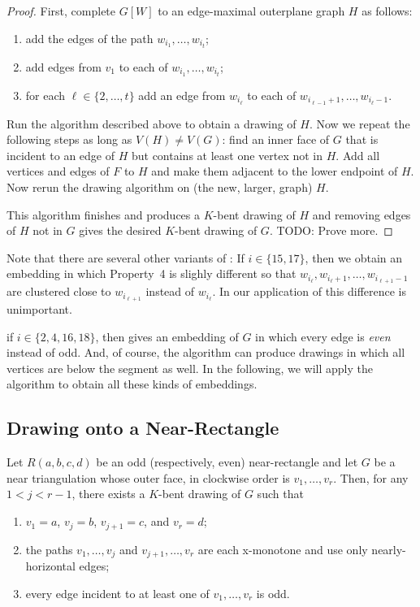 \documentclass{patmorin}
\begin{document}
\begin{proof}
  First, complete $G[W]$ to an edge-maximal outerplane graph $H$ as follows:
\begin{enumerate}
  \item add the edges of the path $w_{i_1},\ldots,w_{i_t}$;
  \item add edges from $v_1$ to each of $w_{i_1},\ldots,w_{i_t}$;
  \item for each $\ell\in\{2,\ldots,t\}$ add an edge from $w_{i_\ell}$ to each of $w_{i_{\ell-1}+1},\ldots,w_{i_\ell-1}$. 
\end{enumerate}
  Run the algorithm described above to obtain a drawing of $H$.  Now we
  repeat the following steps as long as $V(H)\neq V(G)$: find an inner
  face of $G$ that is incident to an edge of $H$ but contains at least
  one vertex not in $H$. Add all vertices and edges of $F$ to $H$ and
  make them adjacent to the lower endpoint of $H$. Now rerun the drawing
  algorithm on (the new, larger, graph) $H$.

  This algorithm finishes and produces a $K$-bent drawing of $H$ and
  removing edges of $H$ not in $G$ gives the desired $K$-bent drawing
  of $G$.  TODO: Prove more.
\end{proof}

Note that there are several other variants of
: If $i\in\{15,17\}$, then we obtain
an embedding in which Property~4 is slighly different so that
$w_{i_\ell},w_{i_\ell+1},\ldots,w_{i_{\ell+1}-1}$ are clustered close
to $w_{i_{\ell+1}}$ instead of $w_{i_\ell}$. In our application of
 this difference is unimportant.

if $i\in\{2,4,16,18\}$, then  gives an embedding
of $G$ in which every edge is \emph{even} instead of odd.  And, of course,
the algorithm can produce drawings in which all vertices are below the
segment as well.  In the following, we will apply the algorithm to obtain
all these kinds of embeddings.




\subsection{Drawing onto a Near-Rectangle}


\begin{lem}
   Let $R(a,b,c,d)$ be an odd (respectively, even) near-rectangle and
   let $G$ be a near triangulation whose outer face, in clockwise order
   is $v_1,\ldots,v_r$.  Then, for any $1<j<r-1$, there exists a $K$-bent
   drawing of $G$ such that
\begin{enumerate}
   \item $v_1=a$, $v_j=b$, $v_{j+1}=c$, and $v_r=d$;
   \item the paths $v_1,\ldots,v_j$ and $v_{j+1},\ldots,v_r$ are each x-monotone and use only nearly-horizontal edges;
   \item every edge incident to at least one of $v_1,\ldots,v_r$ is odd.
\end{enumerate}
\end{lem}
\end{document}

